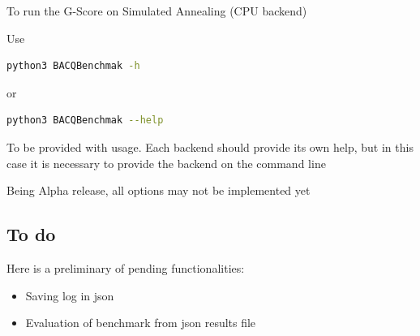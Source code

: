 To run the G-Score on Simulated Annealing (CPU backend)

Use

\begin{lstlisting}[language=bash]
python3 BACQBenchmak -h
\end{lstlisting}

or

\begin{lstlisting}[language=bash]
python3 BACQBenchmak --help 
\end{lstlisting}

To be provided with usage. Each backend should provide its own help, but
in this case it is necessary to provide the backend on the command line

Being Alpha release, all options may not be implemented yet

\subsection{To do}\label{to-do}

Here is a preliminary of pending functionalities:

\begin{itemize}
\tightlist
\item
  Saving log in json
\item
  Evaluation of benchmark from json results file
\end{itemize}
